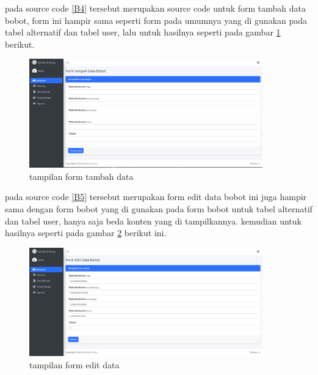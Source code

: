 pada source code \ref{B4} tersebut merupakan source code untuk form tambah data bobot, form ini hampir sama seperti form pada umumnya yang di gunakan pada tabel alternatif dan tabel user, lalu untuk hasilnya seperti pada gambar \ref{ve18} berikut.
\begin{figure}[!htbp]
	\centerline{\includegraphics[width=0.90\textwidth]{figures/bo/add.png}}
	\caption{tampilan form tambah data}
	\label{ve18}
\end{figure}



pada source code \ref{B5} tersebut merupakan form edit data bobot ini juga hampir sama dengan form bobot yang di gunakan pada form bobot untuk tabel alternatif dan tabel user, hanya saja beda konten yang di tampilkannya. kemudian untuk hasilnya seperti pada gambar \ref{ve19} berikut ini.
\begin{figure}[!htbp]
	\centerline{\includegraphics[width=0.90\textwidth]{figures/bo/edit.png}}
	\caption{tampilan form edit data}
	\label{ve19}
\end{figure}


